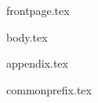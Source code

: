 \documentclass[11pt]{llncs}
\begin{document}
{frontpage.tex}

{body.tex}


\ifccs
  
\else
  
\fi



{appendix.tex}

{commonprefix.tex}
\end{document}
